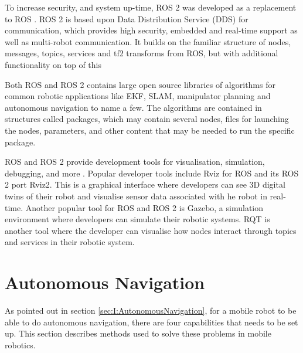 To increase security, and system up-time, ROS 2 was developed as a replacement to ROS \cite{MacenskiROS22022}. ROS 2 is based upon Data Distribution Service (DDS) for communication, which provides high security, embedded and real-time support as well as multi-robot communication. It builds on the familiar structure of nodes, messages, topics, services and tf2 transforms from ROS, but with additional functionality on top of this

Both ROS and ROS 2 contains large open source libraries of algorithms for common robotic applications like EKF, SLAM, manipulator planning and autonomous navigation to name a few. The algorithms are contained in structures called packages, which may contain several nodes, files for launching the nodes, parameters, and other content that may be needed to run the specific package.

ROS and ROS 2 provide development tools for visualisation, simulation, debugging, and more \cite{MacenskiROS22022} \cite{QuigleyROS}. Popular developer tools include Rviz for ROS and its ROS 2 port Rviz2. This is a graphical interface where developers can see 3D digital twins of their robot and visualise sensor data associated with he robot in real-time. Another popular tool for ROS and ROS 2 is Gazebo, a simulation environment where developers can simulate their robotic systems. RQT is another tool where the developer can visualise how nodes interact through topics and services in their robotic system.


\section{Autonomous Navigation} \label{sec:T:AutonomousNavigation}
As pointed out in section \ref{sec:I:AutonomousNavigation}, for a mobile robot to be able to do autonomous navigation, there are four capabilities that needs to be set up. This section describes methods used to solve these problems in mobile robotics.


